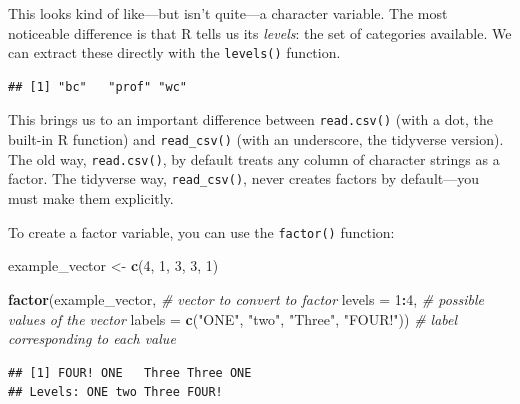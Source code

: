 \documentclass[
  12pt,
  oneside,openany]{book}
\newenvironment{Shaded}{\begin{snugshade}}{\end{snugshade}}
\newcommand{\CommentTok}[1]{\textcolor[rgb]{0.56,0.35,0.01}{\textit{#1}}}
\newcommand{\DataTypeTok}[1]{\textcolor[rgb]{0.13,0.29,0.53}{#1}}
\newcommand{\DecValTok}[1]{\textcolor[rgb]{0.00,0.00,0.81}{#1}}
\newcommand{\KeywordTok}[1]{\textcolor[rgb]{0.13,0.29,0.53}{\textbf{#1}}}
\newcommand{\NormalTok}[1]{#1}
\newcommand{\OperatorTok}[1]{\textcolor[rgb]{0.81,0.36,0.00}{\textbf{#1}}}
\newcommand{\StringTok}[1]{\textcolor[rgb]{0.31,0.60,0.02}{#1}}
\begin{document}
This looks kind of like---but isn't quite---a character variable. The most noticeable difference is that R tells us its \emph{levels}: the set of categories available. We can extract these directly with the \texttt{levels()} function.

\begin{Shaded}
\end{Shaded}

\begin{verbatim}
## [1] "bc"   "prof" "wc"
\end{verbatim}

This brings us to an important difference between \texttt{read.csv()} (with a dot, the built-in R function) and \texttt{read\_csv()} (with an underscore, the tidyverse version). The old way, \texttt{read.csv()}, by default treats any column of character strings as a factor. The tidyverse way, \texttt{read\_csv()}, never creates factors by default---you must make them explicitly.

To create a factor variable, you can use the \texttt{factor()} function:

\begin{Shaded}
\begin{Highlighting}[]
\NormalTok{example\_vector \textless{}{-}}\StringTok{ }\KeywordTok{c}\NormalTok{(}\DecValTok{4}\NormalTok{, }\DecValTok{1}\NormalTok{, }\DecValTok{3}\NormalTok{, }\DecValTok{3}\NormalTok{, }\DecValTok{1}\NormalTok{)}

\KeywordTok{factor}\NormalTok{(example\_vector,  }\CommentTok{\# vector to convert to factor}
       \DataTypeTok{levels =} \DecValTok{1}\OperatorTok{:}\DecValTok{4}\NormalTok{,    }\CommentTok{\# possible values of the vector}
       \DataTypeTok{labels =} \KeywordTok{c}\NormalTok{(}\StringTok{"ONE"}\NormalTok{,}
                  \StringTok{"two"}\NormalTok{,}
                  \StringTok{"Three"}\NormalTok{,}
                  \StringTok{"FOUR!"}\NormalTok{))  }\CommentTok{\# label corresponding to each value}
\end{Highlighting}
\end{Shaded}

\begin{verbatim}
## [1] FOUR! ONE   Three Three ONE  
## Levels: ONE two Three FOUR!
\end{verbatim}
\end{document}
